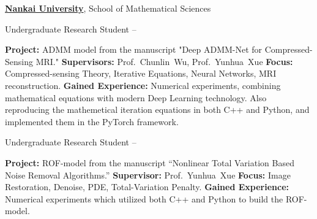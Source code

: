 \documentclass[a4paper,MMMyyyy,nonstopmode]{simpleresumecv}
\begin{document}
\begin{Body}
\BigGap
\Entry
\href{https://www.nankai.edu.cn/main.htm}
{\textbf{Nankai University}},
School of Mathematical Sciences

\Gap
\BulletItem
Undergraduate Research Student
\hfill
{} --
\begin{Detail}
\SubBulletItem
\textbf{Project:}
ADMM model from the manuscript "Deep ADMM-Net for Compressed-Sensing MRI."
\SubBulletItem
\textbf{Supervisors:}
Prof.~Chunlin~Wu, 
Prof.~Yunhua~Xue
\SubBulletItem
\textbf{Focus:}
Compressed-sensing Theory, Iterative Equations, Neural Networks, MRI reconstruction.
\SubBulletItem
\textbf{Gained Experience:}
Numerical experiments, combining mathematical equations with modern Deep Learning technology. 
Also reproducing the mathemetical iteration equations in both C++ and Python, 
and implemented them in the PyTorch framework.
\end{Detail}

\BigGap
\BulletItem
Undergraduate Research Student
\hfill
{} --
\begin{Detail}
\SubBulletItem
\textbf{Project:}
ROF-model from the manuscript “Nonlinear Total Variation Based Noise Removal Algorithms.”
\SubBulletItem
\textbf{Supervisor:}
Prof.~Yunhua~Xue
\SubBulletItem
\textbf{Focus:}
Image Restoration, Denoise, PDE, Total-Variation Penalty.
\SubBulletItem
\textbf{Gained Experience:}
Numerical experiments which utilized both C++ and Python to build the ROF-model.
\end{Detail}







\end{Body}
\end{document}

